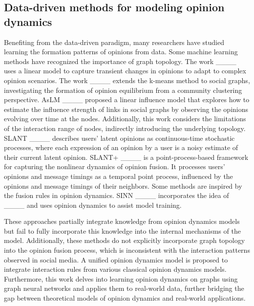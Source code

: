 \subsection{Data-driven methods for modeling opinion dynamics}

Benefiting from the data-driven paradigm, many researchers have studied learning the formation patterns of opinions from data. Some machine learning methods have recognized the importance of graph topology. The work ____ uses a linear model to capture transient changes in opinions to adapt to complex opinion scenarios. The work ____ extends the k-means method to social graphs, investigating the formation of opinion equilibrium from a community clustering perspective. AsLM ____ proposed a linear influence model that explores how to estimate the influence strength of links in social graphs by observing the opinions evolving over time at the nodes. Additionally, this work considers the limitations of the interaction range of nodes, indirectly introducing the underlying topology. SLANT ____ describes users' latent opinions as continuous-time stochastic processes, where each expression of an opinion by a user is a noisy estimate of their current latent opinion. SLANT+ ____ is a point-process-based framework for capturing the nonlinear dynamics of opinion fusion. It processes users' opinions and message timings as a temporal point process, influenced by the opinions and message timings of their neighbors. Some methods are inspired by the fusion rules in opinion dynamics. SINN ____ incorporates the idea of ____ and uses opinion dynamics to assist model training.

These approaches partially integrate knowledge from opinion dynamics models but fail to fully incorporate this knowledge into the internal mechanisms of the model. Additionally, these methods do not explicitly incorporate graph topology into the opinion fusion process, which is inconsistent with the interaction patterns observed in social media. A unified opinion dynamics model is proposed to integrate interaction rules from various classical opinion dynamics models. Furthermore, this work delves into learning opinion dynamics on graphs using graph neural networks and applies them to real-world data, further bridging the gap between theoretical models of opinion dynamics and real-world applications.
